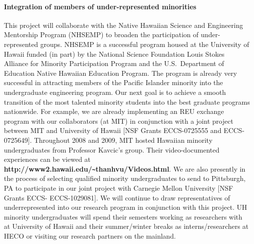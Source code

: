\paragraph{Integration of members of under-represented minorities}

This project will collaborate with the Native Hawaiian Science and
Engineering Mentorship Program (NHSEMP) to broaden the participation of
under-represented groups. NHSEMP is a successful program housed at the
University of Hawaii funded (in part) by the National Science Foundation
Louis Stokes Alliance for Minority Participation Program and the
U.S.~Department of Education Native Hawaiian Education Program. The program
is already very successful in attracting members of the Pacific Islander
minority into the undergraduate engineering program. Our next goal is to
achieve a smooth transition of the most talented minority students into the
best graduate programs nationwide. For example, we are already implementing
an REU exchange program with our collaborators (at MIT) in conjunction with
a joint project between MIT and University of Hawaii [NSF Grants
ECCS-0725555 and ECCS-0725649]. Throughout 2008 and 2009, MIT hosted
Hawaiian minority undergraduates from Professor Kavcic's group. Their
video-documented experiences can be viewed at {\bf
  http://www2.hawaii.edu/\verb+~+thanhvu/Videos.html}. We are also
presently in the process of selecting qualified minority undergraduates to
send to Pittsburgh, PA to participate in our joint project with Carnegie
Mellon University [NSF Grants ECCS- ECCS-1029081]. We will continue to draw
representatives of underrepresented into our research program in
conjunction with this project. UH minority undergraduates will spend their
semesters working as researchers with at University of Hawaii and their
summer/winter breaks as interns/researchers at HECO or visiting our
research partners on the mainland.
